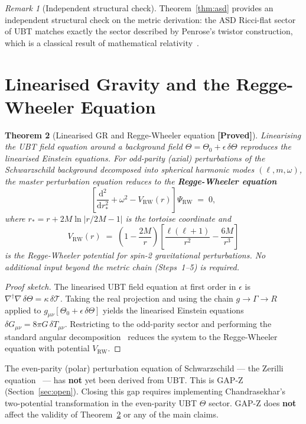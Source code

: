 \documentclass[12pt,a4paper]{article}
\newtheorem{theorem}{Theorem}[section]
\theoremstyle{definition}
\theoremstyle{remark}
\newtheorem{remark}[theorem]{Remark}
\newcommand{\PROVED}{\textbf{[Proved]}}
\newcommand{\gmn}{g_{\mu\nu}}
\newcommand{\Tmn}{T_{\mu\nu}}
\newcommand{\RW}{V_{\mathrm{RW}}}
\begin{document}
\begin{remark}[Independent structural check]
Theorem~\ref{thm:asd} provides an independent structural check on the metric
derivation: the ASD Ricci-flat sector of UBT matches exactly the sector described
by Penrose's twistor construction, which is a classical result of mathematical
relativity~\cite{Penrose1976,Ward1977}.
\end{remark}

\section{Linearised Gravity and the Regge-Wheeler Equation}
\label{sec:rw}

\begin{theorem}[Linearised GR and Regge-Wheeler equation \PROVED]
\label{thm:rw}
Linearising the UBT field equation around a background field
$\Theta = \Theta_0 + \epsilon\,\delta\Theta$ reproduces the linearised Einstein
equations.  For odd-parity (axial) perturbations of the Schwarzschild background
decomposed into spherical harmonic modes $(\ell, m, \omega)$, the master
perturbation equation reduces to the \textbf{Regge-Wheeler equation}
\[
  \left[\frac{\mathrm{d}^2}{\mathrm{d}r_*^2} + \omega^2 - \RW(r)\right]
  \Psi_{\mathrm{RW}} \;=\; 0,
\]
where $r_* = r + 2M\ln|r/2M - 1|$ is the tortoise coordinate and
\[
  \RW(r) \;=\; \left(1-\frac{2M}{r}\right)
  \left[\frac{\ell(\ell+1)}{r^2} - \frac{6M}{r^3}\right]
\]
is the Regge-Wheeler potential for spin-2 gravitational perturbations.
No additional input beyond the metric chain (Steps~1--5) is required.
\end{theorem}

\begin{proof}[Proof sketch]
The linearised UBT field equation at first order in $\epsilon$ is
$\nabla^\dagger\nabla\,\delta\Theta = \kappa\,\delta\mathcal{T}$.  Taking the
real projection and using the chain $g \to \Gamma \to R$ applied to
$\gmn[\Theta_0 + \epsilon\,\delta\Theta]$ yields the linearised Einstein equations
$\delta G_{\mu\nu} = 8\pi G\,\delta\Tmn$.  Restricting to the odd-parity sector
and performing the standard angular decomposition~\cite{Regge1957} reduces the
system to the Regge-Wheeler equation with potential $\RW$.
\end{proof}

\begin{tcolorbox}[colback=orange!4!white,colframe=orange!55!black,
  title=Status of even-parity (Zerilli) equation]
The even-parity (polar) perturbation equation of Schwarzschild --- the Zerilli
equation~\cite{Zerilli1970} --- has \textbf{not} yet been derived from UBT.
This is GAP-Z (Section~\ref{sec:open}).  Closing this gap requires implementing
Chandrasekhar's two-potential transformation in the even-parity UBT $\Theta$
sector.  GAP-Z does \textbf{not} affect the validity of Theorem~\ref{thm:rw}
or any of the main claims.
\end{tcolorbox}
\end{document}
